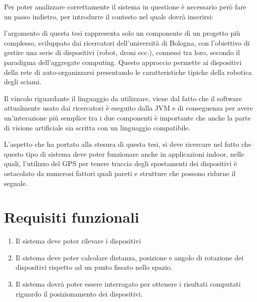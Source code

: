 \documentclass[12pt,a4paper,openright,twoside]{book}
\begin{document}
Per poter analizzare correttamente il sistema in questione è necessario però fare un passo indietro, per introdurre il contesto nel quale dovrà inserirsi:
\begin{adjustwidth}{1cm}{0cm}
l'argomento di questa tesi rappresenta solo un componente di un progetto più complesso, sviluppato dai ricercatori dell'università di Bologna, con l'obiettivo di gestire una serie di dispositivi (robot, droni ecc.), connessi tra loro, secondo il paradigma dell'aggregate computing.
Questo approccio permette ai dispositivi della rete di auto-organizzarsi presentando le caratteristiche tipiche della robotica degli sciami.

Il vincolo riguardante il linguaggio da utilizzare, viene dal fatto che il software attualmente usato dai ricercatori è eseguito dalla JVM e di conseguenza per avere un'interazione più semplice tra i due componenti è importante che anche la parte di visione artificiale sia scritta con un linguaggio compatibile.
\end{adjustwidth}

L'aspetto che ha portato alla stesura di questa tesi, si deve ricercare nel fatto che questo tipo di sistema deve poter funzionare anche in applicazioni indoor, nelle quali, l'utilizzo del GPS per tenere traccia degli spostamenti dei dispositivi è ostacolato da numerosi fattori quali pareti e strutture che possono ridurne il segnale.

\section{Requisiti funzionali} \label{sec:requisiti_funzionali}
\begin{enumerate}[label=RF\arabic*]
	\item Il sistema deve poter rilevare i dispositivi
	\item Il sistema deve poter calcolare distanza, posizione e angolo di rotazione dei dispositivi rispetto ad un punto fissato nello spazio.
	\item Il sistema dovrà poter essere interrogato per ottenere i risultati computati riguardo il posizionamento dei dispositivi.
\end{enumerate}
\end{document}
